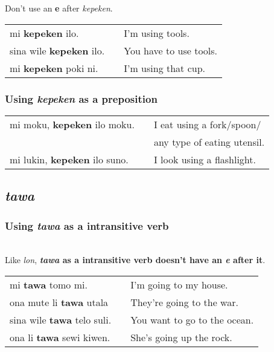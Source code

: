 Don't use an \textbf{e} after \textit{kepeken}.
 
\begin{supertabular}{p{5,5cm}|ll}
mi \textbf{kepeken} ilo. && I'm using tools. \\
sina wile \textbf{kepeken} ilo. && You have to use tools. \\
mi \textbf{kepeken} poki ni. && I'm using that cup. \\
\end{supertabular} 
%
\subsubsection*{Using \textit{kepeken} as a preposition}
%
\begin{supertabular}{p{5,5cm}|ll}
mi moku, \textbf{kepeken} ilo moku. && I eat using a fork/spoon/ \\ && any type of eating utensil. \\
mi lukin, \textbf{kepeken} ilo suno. && I look using a flashlight.  \\
\end{supertabular} 

\subsection*{\textit{tawa}}
%
\subsubsection*{Using \textit{tawa} as a intransitive verb} \\
%
Like \textit{lon}, \textbf{\textit{tawa} as a intransitive verb doesn't have an \textit{e} after it}. \\

\begin{supertabular}{p{5,5cm}|ll}
mi \textbf{tawa} tomo mi. && I'm going to my house. \\
ona mute li \textbf{tawa} utala && They're going to the war. \\
sina wile \textbf{tawa} telo suli. && You want to go to the ocean. \\
ona li \textbf{tawa} sewi kiwen. && She's going up the rock. \\
\end{supertabular} 

